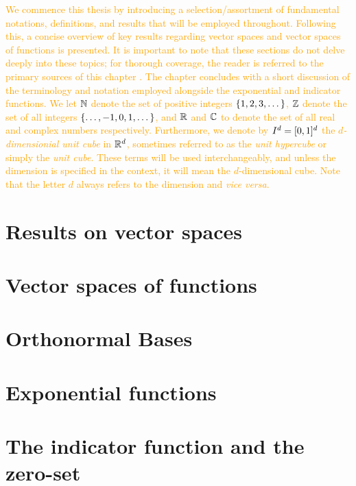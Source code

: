 \documentclass[../thesis.tex]{subfiles}
\begin{document}
\textcolor{orange}{  %
We commence this thesis by introducing a selection/assortment of fundamental notations, definitions, and results that will be employed throughout. Following this, a concise overview of key results regarding vector spaces and vector spaces of functions is presented. It is important to note that these sections do not delve deeply into these topics; for thorough coverage, the reader is referred to the primary sources of this chapter \cite{heilMetricsNormsInner2018,heilIntroductionRealAnalysis2019}. The chapter concludes with a short discussion of the terminology and notation employed alongside the exponential and indicator functions.
} %
\textcolor{orange}{  %
We let $\mathbb{N}$ denote the set of positive integers $\{1,2,3, \dots\}$, $\mathbb{Z}$ denote the set of all integers $\{\dots, -1,0,1, \dots\}$, and $\mathbb{R}$ and $\mathbb{C}$ to denote the set of all real and complex numbers respectively. Furthermore, we denote by $I^d = [0,1]^d$ the \emph{$d$-dimensionial unit cube} in $\mathbb{R}^d$, sometimes referred to as the \emph{unit hypercube} or simply the \emph{unit cube}. These terms will be used interchangeably, and unless the dimension is specified in the context, it will mean the $d$-dimensional cube. Note that the letter $d$ always refers to the dimension and \emph{vice versa}.
} %

\section{Results on vector spaces}  %
    

\section{Vector spaces of functions}  %
    

\section{Orthonormal Bases}
    

\section{Exponential functions}
    

\section{The indicator function and the zero-set}
    
\end{document}

